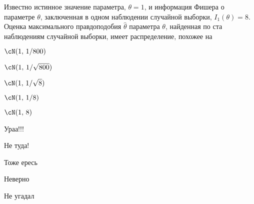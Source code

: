 
\begin{question}
Известно истинное значение параметра, \(\theta=1\), и информация Фишера
о параметре \(\theta\), заключенная в одном наблюдении случайной
выборки, \(I_1(\theta) = 8\). Оценка максимального правдоподобия
\(\hat \theta\) параметра \(\theta\), найденная по ста наблюдениям
случайной выборки, имеет распределение, похожее на
\begin{answerlist}
  \item \(\cN(1, \, 1/800)\)
  \item \(\cN(1, \, 1/\sqrt{800})\)
  \item \(\cN(1, \, 1/\sqrt{8})\)
  \item \(\cN(1, \, 1/8)\)
  \item \(\cN(1, \, 8)\)
\end{answerlist}
\end{question}

\begin{solution}
\begin{answerlist}
  \item Ураа!!!
  \item Не туда!
  \item Тоже ересь
  \item Неверно
  \item Не угадал
\end{answerlist}
\end{solution}

